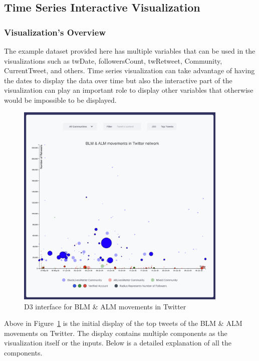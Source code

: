 \subsection{Time Series Interactive Visualization \cite{d3tool}}

\subsubsection{Visualization's Overview}

The example dataset provided here has multiple variables that can be used in the visualizations such as twDate, followersCount, twRetweet, Community, CurrentTweet, and others. Time series visualization can take advantage of having the dates to display the data over time but also the interactive part of the visualization can play an important role to display other variables that otherwise would be impossible to be displayed.



\begin{figure}[H]
\centering
\captionsetup{justification=centering}
\includegraphics[width=0.9\textwidth]{Report-latex/tex_files/pics/example/main.png}
\caption{D3 interface for BLM \& ALM movements in Twitter}
\label{fig:main-interface}
\end{figure}



Above in Figure~\ref{fig:main-interface} is the initial display of the top tweets of the  BLM \& ALM movements on Twitter. The display contains multiple components as the visualization itself or the inputs. Below is a detailed explanation of all the components.

